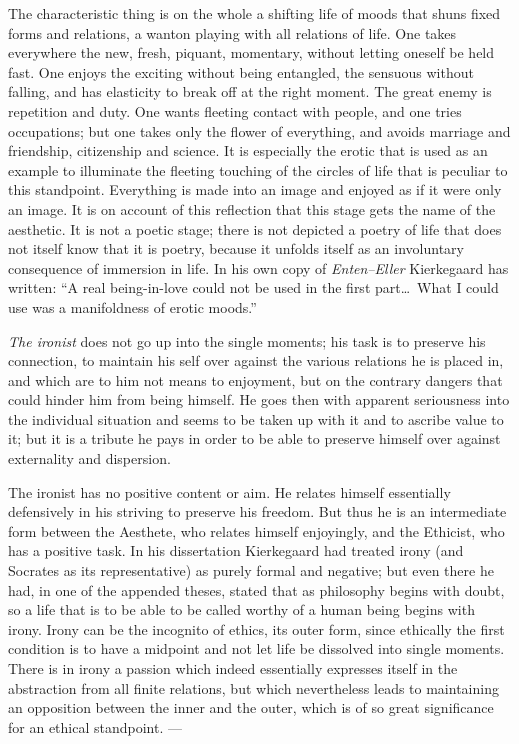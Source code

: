 \documentclass[12pt,a4paper]{book}
\newcommand{\opage}[1]{\marginnote{\footnotesize\textit{[#1]}}}
\begin{document}
The characteristic thing is on the whole a shifting life of moods that shuns fixed forms and
relations, a wanton playing with all relations of life. One takes everywhere the new, fresh,
piquant, momentary, without letting oneself be held fast. One enjoys the exciting without
being entangled, the sensuous without falling, and has elasticity to break off at the right
moment. The great enemy is repetition and duty. One wants fleeting contact with people, and
one tries occupations; but one takes only the flower of everything, and avoids marriage and
friendship, citizenship and science. It is especially the erotic that is used as an example
to illuminate the fleeting touching of the circles of life that is peculiar to this
standpoint. Everything is made into an image and enjoyed as if it were only an image. It is
on account of this reflection that this stage gets the name of the aesthetic. It is not a
poetic stage; there is not depicted a poetry of life that does not itself know that it is
poetry, because it unfolds itself as an involuntary consequence of immersion in life. In his
own copy of \emph{Enten--Eller} Kierkegaard has \opage{158}written: ``A real being-in-love could not be
used in the first part\ldots\ What I could use was a manifoldness of erotic moods.''

\emph{The ironist} does not go up into the single moments; his task is to preserve his
connection, to maintain his self over against the various relations he is placed in, and
which are to him not means to enjoyment, but on the contrary dangers that could hinder him
from being himself. He goes then with apparent seriousness into the individual situation and
seems to be taken up with it and to ascribe value to it; but it is a tribute he pays in order
to be able to preserve himself over against externality and dispersion.

The ironist has no positive content or aim. He relates himself essentially defensively in his
striving to preserve his freedom. But thus he is an intermediate form between the Aesthete,
who relates himself enjoyingly, and the Ethicist, who has a positive task. In his dissertation
Kierkegaard had treated irony (and Socrates as its representative) as purely formal and
negative; but even there he had, in one of the appended theses, stated that as philosophy
begins with doubt, so a life that is to be able to be called worthy of a human being begins
with irony. Irony can be the incognito of ethics, its outer form, since ethically the first
condition is to have a midpoint and not let life be dissolved into single moments. There is in
irony a passion which indeed essentially expresses itself in the abstraction from all finite
relations, but which nevertheless leads to maintaining an opposition between the inner and the
outer, which is of so great significance for an ethical standpoint. ---
\end{document}

